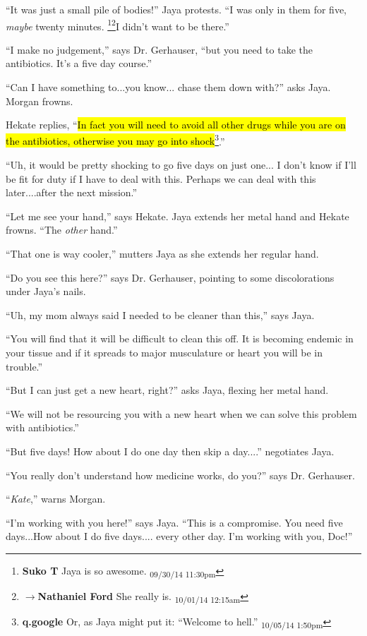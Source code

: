``It was just a small pile of bodies!'' Jaya protests.  ``I was only in them for five, \textit{maybe} twenty minutes.  \footnote{\textbf{Suko T }Jaya is so awesome. \textsubscript{09/30/14 11:30pm}}\footnote{$\rightarrow$\textbf{Nathaniel Ford }She really is. \textsubscript{10/01/14 12:15am}}I didn't want to be there.''

``I make no judgement,'' says Dr. Gerhauser, ``but you need to take the antibiotics.  It's a five day course.''

``Can I have something to...you know... chase them down with?'' asks Jaya.  Morgan frowns.

Hekate replies, ``\hl{In fact you will need to avoid all other drugs while you are on the antibiotics, otherwise you may go into shock}\footnote{\textbf{q.google }Or, as Jaya might put it: ``Welcome to hell.'' \textsubscript{10/05/14 1:50pm}}.''

``Uh, it would be pretty shocking to go five days on just one... I don't know if I'll be fit for duty if I have to deal with this.  Perhaps we can deal with this later....after the next mission.''

``Let me see your hand,'' says Hekate.  Jaya extends her metal hand and Hekate frowns.  ``The \textit{other} hand.''

``That one is way cooler,'' mutters Jaya as she extends her regular hand.

``Do you see this here?'' says Dr. Gerhauser, pointing to some discolorations under Jaya's nails.

``Uh, my mom always said I needed to be cleaner than this,'' says Jaya.

``You will find that it will be difficult to clean this off.  It is becoming endemic in your tissue and if it spreads to major musculature or heart you will be in trouble.''

``But I can just get a new heart, right?'' asks Jaya, flexing her metal hand.

``We will not be resourcing you with a new heart when we can solve this problem with antibiotics.''

``But five days!  How about I do one day then skip a day....'' negotiates Jaya.

``You really don't understand how medicine works, do you?'' says Dr. Gerhauser.

``\textit{Kate},'' warns Morgan.

``I'm working with you here!'' says Jaya.  ``This is a compromise.  You need five days...How about I do five days.... every other day.  I'm working with you, Doc!''

